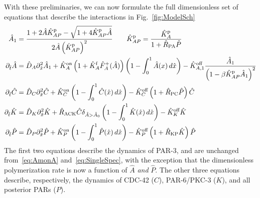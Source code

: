 \documentclass[11pt]{article}
\newcommand{\6}[1]{#1_{\text{6}}}
\newcommand{\3}[1]{#1_{\text{3}}}
\begin{document}
With these preliminaries, we can now formulate the full dimensionless set of equations that describe the  interactions in Fig.\ \ref{fig:ModelSch}
\begin{subequations}
\label{eq:AllBC}
\begin{align}
\hat A_1 &= \frac{1+2\hat A \hat{K}^\text{p}_{AP}-\sqrt{1+4 \hat{K}^\text{p}_{AP} \hat A}}{2 \hat A \left(\hat{K}^\text{p}_{AP}\right)^2} \qquad \hat{K}^\text{p}_{AP}=\frac{\hat{K}^\text{p}_A}{1+\hat R_\text{PA} \hat P}\\ 
\partial_{\hat{t}} \hat A &= \hat{D}_A \partial_{\hat{x}}^2 \hat A_1+\hat{K}^\text{on}_A \left(1+\hat{K}^\text{f}_A \hat F_A^+(\hat A) \right)\left(1 - \int_0^1 \hat A(x) \, d\hat{x} \right) - \hat{K}^\text{off}_{A,1}  \frac{\hat A_1}{\left(1-\beta \hat{K}^\text{p}_{AP} \hat A_1\right)^2}\\
\label{eq:Ceqn}
\partial_{\hat{t}} \hat{C}& =\hat{D}_C \partial_{\hat{x}}^2 \hat{C} +\hat{K}^\text{on}_C \left(1 - \int_0^1 \hat{C}(\hat x) \, d\hat{x} \right)  - \hat{K}^\text{off}_C \left(1+\hat{R}_\text{PC}\hat P\right)\hat{C}\\
\label{eq:Keqn}
\partial_{\hat{t}} \hat{K}  &= \hat{D}_K \partial_{\hat{x}}^2 \hat{K} + \hat{R}_\text{ACK} \hat{C} \delta_{\hat A > \hat A_0} \left(1 - \int_0^1 \hat{K}(\hat x) \, d\hat{x} \right)-\hat{K}^\text{off}_K \hat{K} \\
\partial_{\hat{t}} \hat{P} & =\hat{D}_P \partial_{\hat{x}}^2 \hat{P} +\hat{K}^\text{on}_P \left(1 - \int_0^1 \hat{P}(\hat x) \, d\hat{x} \right)  - \hat{K}^\text{off}_P \left(1+\hat{R}_\text{KP}\hat{K}\right)\hat{P}
\end{align}
\end{subequations}
The first two equations describe the dynamics of PAR-3, and are unchanged from\ \eqref{eq:AmonA} and\ \eqref{eq:SingleSpec}, with the exception that the dimensionless polymerization rate is now a function of $\hat A$ \emph{and} $\hat P$. The other three equations describe, respectively, the dynamics of CDC-42 ($C$), PAR-6/PKC-3 ($K$), and all posterior PARs ($P$). 
\end{document}

